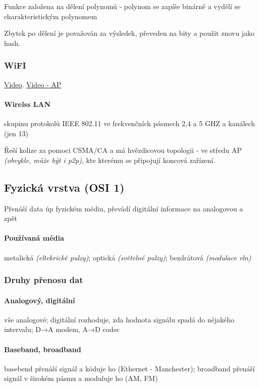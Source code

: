 \documentclass[10pt,a4paper]{article}
\begin{document}
Funkce založena na dělení polynomů - polynom se zapíše binárně a vydělí se charakteristickým polynomem

Zbytek po dělení je považován za výsledek, převeden na bity a použit znovu jako hash.


\subsubsection{WiFI}

\href{https://youtu.be/J_bf_KE5llQ}{Video}.
\href{https://youtu.be/OxiY4yf6GGg}{Video - AP}

\paragraph*{Wirelss LAN} skupinu protokolů IEEE 802.11 ve frekvenčních pásmech 2,4 a 5 GHZ a kanálech (jen 13)

Řeší kolize za pomoci CSMA/CA a má hvězdicovou topologii - ve středu AP \textit{(obvykle, může být i p2p)}, kte kterému se připojují koncová zařízení.

\subsection{Fyzická vrstva (OSI 1)}

Přenáší data úp fyzickém médiu, převádí digitální informace na analogovou a zpět

\paragraph*{Používaná média} metalická \textit{(eltekrické pulzy)}; optická \textit{(světelné pulzy)}; bezdrátová \textit{(modulace vln)}

\subsubsection{Druhy přenosu dat}

\paragraph*{Analogový, digitální} vše analogové; digitální rozhoduje, zda hodnota signálu spadá do nějakého intervalu; D→A modem, A→D codec
\paragraph*{Baseband, broadband} basebend přenáší signál a kóduje ho (Ethernet - Manchester); broadband přenáší signál v širokém pásmu a moduluje ho (AM, FM)
\end{document}

